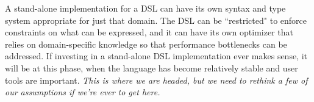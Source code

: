 \documentclass[10pt,twoside]{article}
\begin{document}
A stand-alone implementation for a DSL can have its own syntax and type system
appropriate for just that domain. The DSL can be ``restricted" to enforce
constraints on what can be expressed, and it can have its own optimizer that
relies on domain-specific knowledge so that performance bottlenecks
can be addressed. If investing in a stand-alone DSL implementation ever makes
sense, it will be at this phase, when the language has become relatively
stable and user tools are important. {\em This is where we are headed, but we need to rethink
a few of our assumptions if we're ever to get here.}




\end{document}
